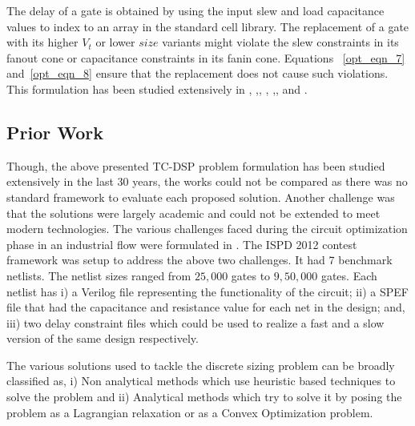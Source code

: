 \noindent The delay of a gate is obtained by using the input slew and load capacitance values to index to an array in the standard cell library. The replacement of a gate with its higher $V_t$ or lower $size$ variants might violate the slew constraints in its fanout cone or capacitance constraints in its fanin cone. Equations ~\ref{opt_eqn_7} and~\ref{opt_eqn_8} ensure that the replacement does not cause such violations.
This formulation has been studied extensively in \cite{hu:12}, \cite{hu:13},\cite{reiman:13}, \cite{li:12}, \cite{ozdal:12},\cite{hu:13}, and \cite{rahman:12} .

\subsection{Prior Work}

Though, the above presented TC-DSP problem formulation has been studied extensively in the last 30 years, the works could not be compared as there was no standard framework to evaluate each proposed solution. Another challenge was that the solutions were largely academic and could not be extended to meet modern technologies. The various challenges faced during the circuit optimization phase in an industrial flow were formulated in \cite{ozdal:12}. The ISPD 2012\cite{ispd:12} contest framework was setup to address the above two challenges. 
It had 7 benchmark netlists. The netlist sizes ranged from $25,000$ gates to $9,50,000$ gates. Each netlist has i) a Verilog file representing the functionality of the circuit; ii) a SPEF file that had the capacitance and resistance value for each net in the design; and, iii) two delay constraint files which could be used to realize a fast and a slow version of the same design respectively.

The various solutions used to tackle the discrete sizing problem can be broadly classified as, i) Non analytical methods which use heuristic based techniques to solve the problem and ii) Analytical methods which try to solve it by posing the problem as a Lagrangian relaxation or as a Convex Optimization problem.

